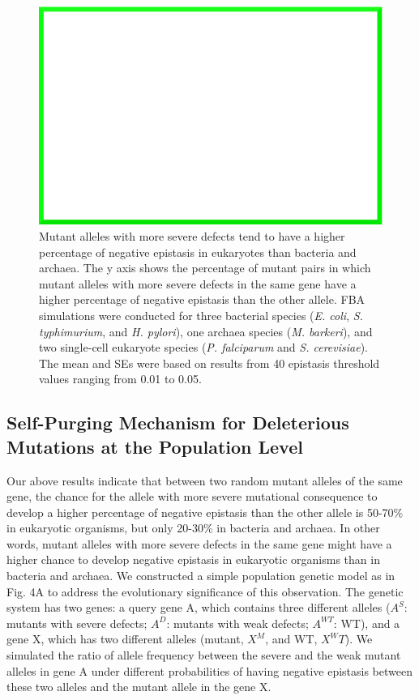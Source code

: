 \begin{figure}
\centering
\includegraphics[width=\textwidth]{dummy}
\caption{Mutant alleles with more severe defects tend to have a higher
percentage of negative epistasis in eukaryotes than bacteria and
archaea. The y axis shows the percentage of mutant pairs in which
mutant alleles with more severe defects in the same gene have a higher
percentage of negative epistasis than the other allele. FBA
simulations were conducted for three bacterial species
(\textit{E. coli}, \textit{S. typhimurium}, and \textit{H. pylori}),
one archaea species (\textit{M. barkeri}), and two single-cell
eukaryote species (\textit{P. falciparum} and
\textit{S. cerevisiae}). The mean and SEs were based on results from
40 epistasis threshold values ranging from 0.01 to 0.05.}
\label{fig:speciesPurging}
\end{figure}

\subsection{Self-Purging Mechanism for Deleterious Mutations at the
Population Level}

Our above results indicate that between two random mutant alleles of
the same gene, the chance for the allele with more severe mutational
consequence to develop a higher percentage of negative epistasis than
the other allele is 50-70\% in eukaryotic organisms, but only 20-30\% in
bacteria and archaea. In other words, mutant alleles with more severe
defects in the same gene might have a higher chance to develop
negative epistasis in eukaryotic organisms than in bacteria and
archaea. We constructed a simple population genetic model as in
Fig. 4A to address the evolutionary significance of this
observation. The genetic system has two genes: a query gene A, which
contains three different alleles ($A^S$: mutants with severe defects; $A^D$:
mutants with weak defects; $A^{WT}$: WT), and a gene X, which has two
different alleles (mutant, $X^M$, and WT, $X^WT$). We simulated the ratio of
allele frequency between the severe and the weak mutant alleles in
gene A under different probabilities of having negative epistasis
between these two alleles and the mutant allele in the gene X.

